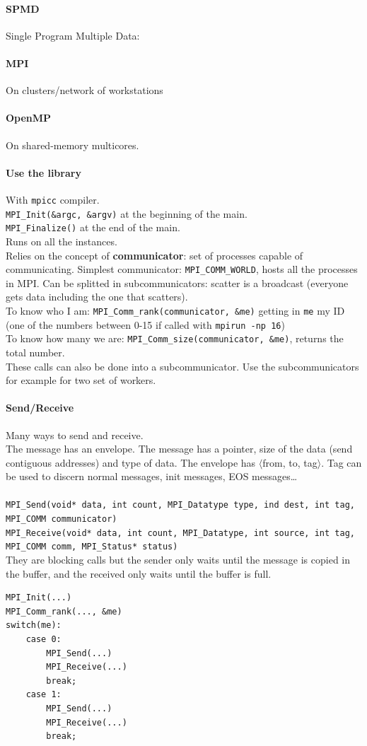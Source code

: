 \documentclass[10pt]{report}
\begin{document}
\paragraph{SPMD} Single Program Multiple Data: %
\paragraph{MPI} On clusters/network of workstations
\paragraph{OpenMP} On shared-memory multicores.
\paragraph{Use the library} With \texttt{mpicc} compiler.\\
\texttt{MPI\_Init(\&argc, \&argv)} at the beginning of the main.\\
\texttt{MPI\_Finalize()} at the end of the main.\\
Runs on all the instances.\\
Relies on the concept of \textbf{communicator}: set of processes capable of communicating. Simplest communicator: \texttt{MPI\_COMM\_WORLD}, hosts all the processes in MPI. Can be splitted in subcommunicators: scatter is a broadcast (everyone gets data including the one that scatters).\\
To know who I am: \texttt{MPI\_Comm\_rank(communicator, \&me)} getting in \texttt{me} my ID (one of the numbers between 0-15 if called with \texttt{mpirun -np 16})\\
To know how many we are: \texttt{MPI\_Comm\_size(communicator, \&me)}, returns the total number.\\
These calls can also be done into a subcommunicator. Use the subcommunicators for example for two set of workers.
\paragraph{Send/Receive} Many ways to send and receive.\\
The message has an envelope. The message has a pointer, size of the data (send contiguous addresses) and type of data. The envelope has $\langle$from, to, tag$\rangle$. Tag can be used to discern normal messages, init messages, EOS messages\ldots\\\\
\texttt{MPI\_Send(void* data, int count, MPI\_Datatype type, ind dest, int tag, MPI\_COMM communicator)}\\
\texttt{MPI\_Receive(void* data, int count, MPI\_Datatype, int source, int tag, MPI\_COMM comm, MPI\_Status* status)}\\
They are blocking calls but the sender only waits until the message is copied in the buffer, and the received only waits until the buffer is full.
\begin{lstlisting}[style=myC]
MPI_Init(...)
MPI_Comm_rank(..., &me)
switch(me):
	case 0:
		MPI_Send(...)
		MPI_Receive(...)
		break;
	case 1:
		MPI_Send(...)
		MPI_Receive(...)
		break;
\end{lstlisting}
\end{document}

